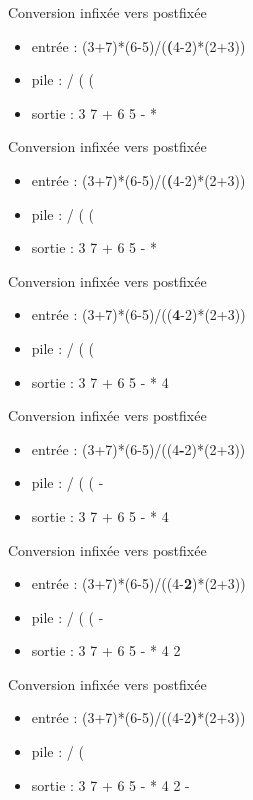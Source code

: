 \documentclass[12pt,a4paper]{beamer}
\begin{document}
\begin{frame}{Conversion infixée vers postfixée}
\begin{itemize}
\item entrée : (3+7)*(6-5)/(\textbf{(}4-2)*(2+3))
\item pile : / ( (
\item sortie : 3 7 + 6 5 - *
\end{itemize}
\end{frame}

\begin{frame}{Conversion infixée vers postfixée}
\begin{itemize}
\item entrée : (3+7)*(6-5)/(\textbf{(}4-2)*(2+3))
\item pile : / ( (
\item sortie : 3 7 + 6 5 - *
\end{itemize}
\end{frame}

\begin{frame}{Conversion infixée vers postfixée}
\begin{itemize}
\item entrée : (3+7)*(6-5)/((\textbf{4}-2)*(2+3))
\item pile : / ( (
\item sortie : 3 7 + 6 5 - * 4
\end{itemize}
\end{frame}

\begin{frame}{Conversion infixée vers postfixée}
\begin{itemize}
\item entrée : (3+7)*(6-5)/((4\textbf{-}2)*(2+3))
\item pile : / ( ( - 
\item sortie : 3 7 + 6 5 - * 4
\end{itemize}
\end{frame}

\begin{frame}{Conversion infixée vers postfixée}
\begin{itemize}
\item entrée : (3+7)*(6-5)/((4-\textbf{2})*(2+3))
\item pile : / ( ( - 
\item sortie : 3 7 + 6 5 - * 4 2
\end{itemize}
\end{frame}

\begin{frame}{Conversion infixée vers postfixée}
\begin{itemize}
\item entrée : (3+7)*(6-5)/((4-2\textbf{)}*(2+3))
\item pile : / ( 
\item sortie : 3 7 + 6 5 - * 4 2 -
\end{itemize}
\end{frame}
\end{document}
